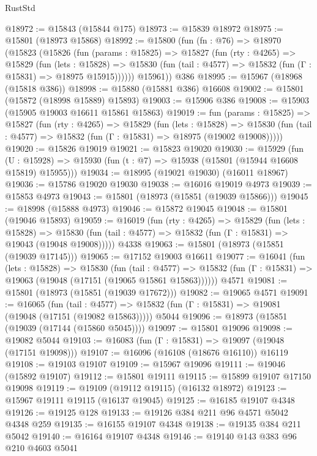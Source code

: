 \begin{lexlean}{RustStd}
\begin{coremodule}
@18972 := @15843 (@15844 @175)
@18973 := @15839 @18972
@18975 := @15801 (@18973 @15868)
@18992 := @15800
    (fun (fn : @76) =>
    @18970
      (@15823
        (@15826
          (fun (params : @15825) =>
          @15827
            (fun (rty : @4265) =>
            @15829
              (fun (lets : @15828) =>
              @15830 (fun (tail : @4577) => @15832 (fun (Γ : @15831) => @18975 @15915))))))
        @15961))
    @386
@18995 := @15967 (@18968 (@15818 @386))
@18998 := @15880 (@15881 @386) @16608
@19002 := @15801 (@15872 (@18998 @15889) @15893)
@19003 := @15906 @386
@19008 := @15903 (@15905 @19003 @16611 @15861 @15863)
@19019 := fun (params : @15825) =>
  @15827
    (fun (rty : @4265) =>
    @15829
      (fun (lets : @15828) =>
      @15830 (fun (tail : @4577) => @15832 (fun (Γ : @15831) => @18975 (@19002 @19008)))))
@19020 := @15826 @19019
@19021 := @15823 @19020
@19030 := @15929
    (fun (U : @15928) => @15930 (fun (t : @7) => @15938 (@15801 (@15944 @16608 @15819) @15955)))
@19034 := @18995 (@19021 @19030) (@16011 @18967)
@19036 := @15786 @19020 @19030
@19038 := @16016 @19019 @4973
@19039 := @15853 @4973
@19043 := @15801 (@18973 (@15851 (@19039 @15866)))
@19045 := @18998 (@15888 @4973)
@19046 := @15872 @19045
@19048 := @15801 (@19046 @15893)
@19059 := @16019
    (fun (rty : @4265) =>
    @15829
      (fun (lets : @15828) =>
      @15830 (fun (tail : @4577) => @15832 (fun (Γ : @15831) => @19043 (@19048 @19008)))))
    @4338
@19063 := @15801 (@18973 (@15851 (@19039 @17145)))
@19065 := @17152 @19003 @16611
@19077 := @16041
    (fun (lets : @15828) =>
    @15830
      (fun (tail : @4577) =>
      @15832 (fun (Γ : @15831) => @19063 (@19048 (@17151 (@19065 @15861 @15863))))))
    @4571
@19081 := @15801 (@18973 (@15851 (@19039 @17672)))
@19082 := @19065 @4571
@19091 := @16065
    (fun (tail : @4577) => @15832 (fun (Γ : @15831) => @19081 (@19048 (@17151 (@19082 @15863)))))
    @5044
@19096 := @18973 (@15851 (@19039 (@17144 (@15860 @5045))))
@19097 := @15801 @19096
@19098 := @19082 @5044
@19103 := @16083 (fun (Γ : @15831) => @19097 (@19048 (@17151 @19098)))
@19107 := @16096 (@16108 (@18676 @16110)) @16119
@19108 := @19103 @19107
@19109 := @15967 @19096
@19111 := @19046 (@15892 @19107)
@19112 := @15801 @19111
@19115 := @15899 @19107 @17150 @19098
@19119 := @19109 (@19112 @19115) (@16132 @18972)
@19123 := @15967 @19111 @19115 (@16137 @19045)
@19125 := @16185 @19107 @4348
@19126 := @19125 @128
@19133 := @19126 @384 @211 @96 @4571 @5042 @4348 @259
@19135 := @16155 @19107 @4348
@19138 := @19135 @384 @211 @5042
@19140 := @16164 @19107 @4348
@19146 := @19140 @143 @383 @96 @210 @4603 @5041

\end{coremodule}
\end{lexlean}
